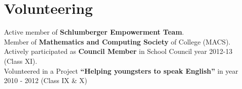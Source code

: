 \documentclass[a4paper]{deedy-resume-openfont}
\begin{document}
\begin{minipage}[t]{0.33\textwidth}



\section{Volunteering}
\textbullet{} Active member of \textbf{Schlumberger Empowerment Team}. \\
\textbullet{} Member of \textbf{Mathematics and Computing Society} of College (MACS). \\
\textbullet{} Actively participated as \textbf{Council Member} in School Council year 2012-13 (Class XI). \\
\textbullet{} Volunteered in a Project \textbf{“Helping youngsters to speak English”} in year 2010 - 2012 (Class IX \& X)
\sectionsep

%
%

\end{minipage} 
\hfill
\end{document}
